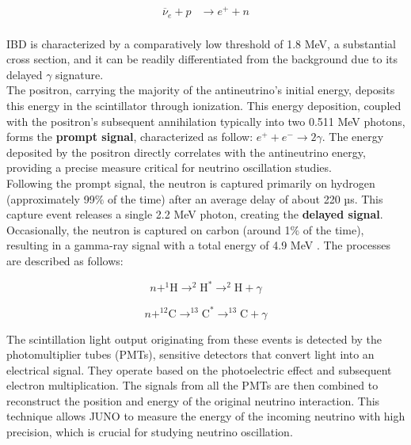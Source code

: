 \begin{equation}
	\begin{aligned}
		\overline{\nu}_e + p &\rightarrow e^+ + n \\
	\end{aligned}
\end{equation}

IBD is characterized by a comparatively low threshold of 1.8 MeV, a substantial cross section, and it can be readily differentiated from the background due to its delayed $\gamma$ signature.\\

The positron, carrying the majority of the antineutrino's initial energy, deposits this energy in the scintillator through ionization. This energy deposition, coupled with the positron's subsequent annihilation typically into two 0.511 MeV photons, forms the \textbf{prompt signal}, characterized as follow: $e^{+} + e^{-} \rightarrow 2\gamma$.
The energy deposited by the positron directly correlates with the antineutrino energy, providing a precise measure critical for neutrino oscillation studies.\\

Following the prompt signal, the neutron is captured primarily on hydrogen (approximately 99$\%$ of the time) after an average delay of about 220 µs. This capture event releases a single 2.2 MeV photon, creating the \textbf{delayed signal}. Occasionally, the neutron is captured on carbon (around 1$\%$ of the time), resulting in a gamma-ray signal with a total energy of 4.9 MeV \cite{Sub_osci}. The processes are described as follows:

\begin{equation}
	 n + ^{1}\text{H} \rightarrow ^{2}\text{H}^{*} \rightarrow ^2\text{H} + \gamma
\end{equation}

\begin{equation}
n + ^{12}\text{C} \rightarrow ^{13}\text{C}^{*} \rightarrow ^{13}\text{C} + \gamma
\end{equation}

The scintillation light output originating from these events is detected by the photomultiplier tubes (PMTs), sensitive detectors that convert light into an electrical signal. They operate based on the photoelectric effect and subsequent electron multiplication. The signals from all the PMTs are then combined to reconstruct the position and energy of the original neutrino interaction. This technique allows JUNO to measure the energy of the incoming neutrino with high precision, which is crucial for studying neutrino oscillation. %


